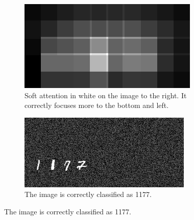 
\begin{figure}
    \centering
    \begin{subfigure}[c]{0.45\textwidth}
        \centering    \includegraphics[scale=2.0]{resources/MNIST_soft_att/1177_att.jpg}
        \caption{Soft attention in white on the image to the right. It correctly focuses more to the bottom and left.}
    \end{subfigure} \quad %
    \begin{subfigure}[c]{0.45\textwidth}
        \centering
        \includegraphics[scale=2.0]{resources/MNIST_soft_att/1177_correct.jpg}
        \caption{The image is correctly classified as 1177.}
    \end{subfigure}
    

\end{figure}
